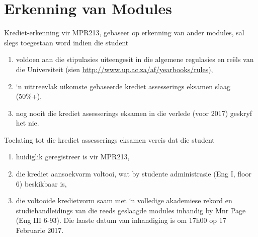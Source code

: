 \newpage
\section{Erkenning van Modules} \label{sec:credit_study_guide}
    \noindent
    Krediet-erkenning vir MPR213, gebaseer op erkenning van ander modules,
    sal slegs toegestaan word indien die student
    \begin{enumerate}
        \item voldoen aan die stipulasies uiteengesit in die algemene
            regulasies en re\"els van die Universiteit (sien
            \url{http://www.up.ac.za/af/yearbooks/rules}),
        \item `n uittreevlak uikomste gebaseerde krediet assesserings eksamen
            slaag (50\%+),
        \item nog nooit die krediet assesserings eksamen in die verlede (voor
            2017) geskryf het nie.
    \end{enumerate}

    \noindent
    Toelating tot die krediet assesserings eksamen vereis dat die student
    \begin{enumerate}
        \item huidiglik geregistreer is vir MPR213,
        \item die krediet aansoekvorm voltooi, wat by studente administrasie
            (Eng I, floor 6) beskikbaar is,
        \item die voltooide kredietvorm saam met `n volledige akademiese rekord
            en studiehandleidings van die reeds geslaagde modules inhandig by
            Mnr Page (Eng III 6-93). Die laaste datum van inhandiging is om
            17h00 op 17 Februarie 2017.
    \end{enumerate}

